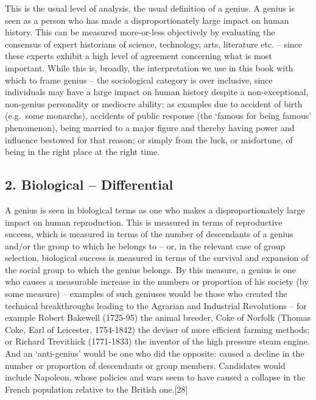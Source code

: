 \documentclass[
]{book}
\begin{document}
This is the usual level of analysis, the usual definition of a genius. A genius is seen as a person who has made a disproportionately large impact on human history. This can be measured more-or-less objectively by evaluating the consensus of expert historians of science, technology, arts, literature etc. -- since these experts exhibit a high level of agreement concerning what is most important.
While this is, broadly, the interpretation we use in this book with which to frame genius -- the sociological category is over inclusive, since individuals may have a large impact on human history despite a non-exceptional, non-genius personality or mediocre ability; as examples due to accident of birth (e.g.~some monarchs), accidents of public response (the `famous for being famous' phenomenon), being married to a major figure and thereby having power and influence bestowed for that reason; or simply from the luck, or misfortune, of being in the right place at the right time.

\hypertarget{biological-differential}{%
\subsection*{2. Biological -- Differential}\label{biological-differential}}

A genius is seen in biological terms as one who makes a disproportionately large impact on human reproduction. This is measured in terms of reproductive success, which is measured in terms of the number of descendants of a genius and/or the group to which he belongs to -- or, in the relevant case of group selection, biological success is measured in terms of the survival and expansion of the social group to which the genius belongs.
By this measure, a genius is one who causes a measurable increase in the numbers or proportion of his society (by some measure) -- examples of such geniuses would be those who created the technical breakthroughs leading to the Agrarian and Industrial Revolutions -- for example Robert Bakewell (1725-95) the animal breeder, Coke of Norfolk (Thomas Coke, Earl of Leicester, 1754-1842) the deviser of more efficient farming methods; or Richard Trevithick (1771-1833) the inventor of the high pressure steam engine.
And an `anti-genius' would be one who did the opposite: caused a decline in the number or proportion of descendants or group members. Candidates would include Napoleon, whose policies and wars seem to have caused a collapse in the French population relative to the British one.{[}28{]}
\end{document}
